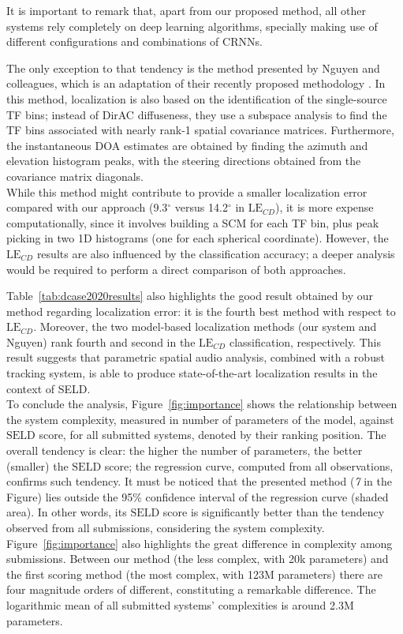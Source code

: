 It is important to remark that, apart from our proposed method, all other systems rely completely on deep learning algorithms, specially making use of different configurations and combinations of CRNNs. 

The only exception to that tendency is the method presented by Nguyen and colleagues, which is an adaptation of their recently proposed methodology \cite{Nguyen2020_task3_report, nguyen2020sequence}. In this method, localization is also based on the identification of the single-source TF bins; instead of DirAC diffuseness, they use a subspace analysis to find the TF bins associated with nearly rank-1 spatial covariance matrices. 
Furthermore, the instantaneous DOA estimates are obtained by finding the azimuth and elevation histogram peaks, with the steering directions obtained from the covariance matrix diagonals. \\

While this method might contribute to provide a smaller localization error compared with our approach (9.3$^{\circ}$ versus 14.2$^{\circ}$ in $\text{LE}_{CD}$), it is more expense computationally, since it involves building a SCM for each TF bin, plus peak picking in two 1D histograms (one for each spherical coordinate). 
However, the $\text{LE}_{CD}$ results are also influenced by the classification accuracy; a deeper analysis would be required to perform a direct comparison of both approaches.

Table~\ref{tab:dcase2020results} also highlights the good result obtained by our method regarding localization error: it is the fourth best method with respect to $\text{LE}_{CD}$. 
Moreover, the two model-based localization methods (our system and Nguyen) rank fourth and second in the $\text{LE}_{CD}$ classification, respectively. 
This result suggests that parametric spatial audio analysis, combined with a robust tracking system, is able to produce state-of-the-art localization results in the context of SELD. \\

To conclude the analysis, Figure~\ref{fig:importance} shows the relationship between the system complexity, measured in number of parameters of the model, against $\text{SELD}$ score, for all submitted systems, denoted by their ranking position. 
The overall tendency is clear: the higher the number of parameters, the better (smaller) the $\text{SELD}$ score; the regression curve, computed from all observations, confirms such tendency. 
It must be noticed that the presented method (\textit{7} in the Figure) lies outside the 95\% confidence interval of the regression curve (shaded area). In other words, its $\text{SELD}$ score is significantly better than the tendency observed from all submissions, considering the system complexity. 
Figure~\ref{fig:importance} also highlights the great difference in complexity among submissions. Between our method (the less complex, with 20k parameters) and the first scoring method (the most complex, with 123M parameters) there are four magnitude orders of different, constituting a remarkable difference. The logarithmic mean of all submitted systems' complexities is around 2.3M parameters. 

